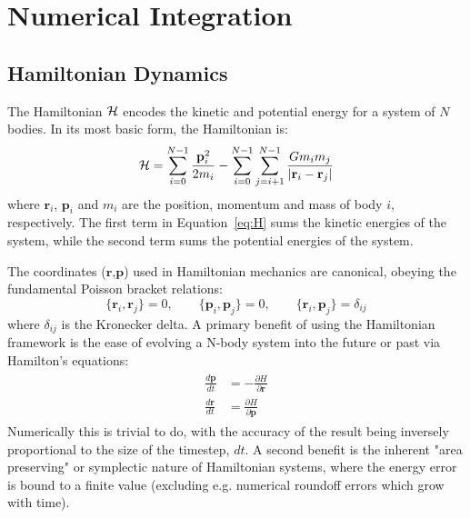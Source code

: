 \section{Numerical Integration}
\subsection{Hamiltonian Dynamics}
The Hamiltonian $\mathcal{H}$ encodes the kinetic and potential energy for a system of $N$ bodies. 
In its most basic form, the Hamiltonian is:
\begin{equation}
\mathcal{H}  = \sum_{i=0}^{N-1} \frac{\textbf{p}_i^2}{2m_i} - \sum_{i=0}^{N-1} \sum_{j=i+1}^{N-1} \frac{Gm_im_j}{|\textbf{r}_i - \textbf{r}_j|}
\label{eq:H}
\end{equation}
where $\textbf{r}_i$, $\textbf{p}_i$ and $m_i$ are the position, momentum and mass of body $i$, respectively. 
The first term in Equation~\ref{eq:H} sums the kinetic energies of the system, while the second term sums the potential energies of the system.

The coordinates ($\textbf{r}$,$\textbf{p}$) used in Hamiltonian mechanics are canonical, obeying the fundamental Poisson bracket relations:
\begin{equation}
\{\textbf{r}_i, \textbf{r}_j\} = 0, \qquad
\{\textbf{p}_i, \textbf{p}_j\} = 0, \qquad
\{\textbf{r}_i, \textbf{p}_j\} = \delta_{ij}
\end{equation}
where $\delta_{ij}$ is the Kronecker delta. 
A primary benefit of using the Hamiltonian framework is the ease of evolving a N-body system into the future or past via Hamilton's equations:
\begin{align}
\begin{split}
\frac{d\textbf{p}}{dt} &= -\frac{\partial H}{\partial \textbf{r}} \\
\frac{d\textbf{r}}{dt} &= \frac{\partial H}{\partial \textbf{p}} 
\label{eq:Heq}
\end{split}
\end{align}
Numerically this is trivial to do, with the accuracy of the result being inversely proportional to the size of the timestep, $dt$.
A second benefit is the inherent "area preserving" or symplectic nature of Hamiltonian systems, where the energy error is bound to a finite value (excluding e.g. numerical roundoff errors which grow with time).

